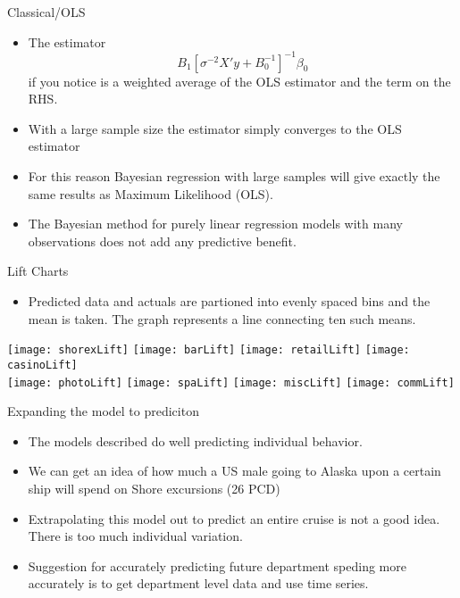 \documentclass{beamer}
\begin{document}
\begin{frame}{Classical/OLS}
	\begin{itemize}
		\item The estimator \[ B_1[\sigma^{-2} X'y + B_0^{-1} ]^{-1} \beta_0 \]
		 if you notice is a weighted average of the OLS estimator and the term on the RHS. 
		 \item With a large sample size the estimator simply converges to the OLS estimator
		 \item For this reason Bayesian regression with large samples will give exactly the same results as Maximum Likelihood (OLS). 
		 \item The Bayesian method for purely linear regression models with many observations does not add any predictive benefit. 
	\end{itemize}
\end{frame}
	
\begin{frame}{Lift Charts}
	\begin{itemize}
		\item Predicted data and actuals are partioned into evenly spaced bins and the mean is taken. The graph represents a line connecting ten such means.
	\end{itemize}
	\centering
	\texttt{[image: shorexLift]} \texttt{[image: barLift]} \texttt{[image: retailLift]} \texttt{[image: casinoLift]} \\
	\texttt{[image: photoLift]} \texttt{[image: spaLift]} \texttt{[image: miscLift]} \texttt{[image: commLift]} 
\end{frame}	

	
\begin{frame}{Expanding the model to prediciton}
	\begin{itemize}
		\item The models described do well predicting individual behavior. 
		\item We can get an idea of how much a US male going to Alaska upon a certain ship will spend on Shore excursions (26 PCD)
		\item Extrapolating this model out to predict an entire cruise is not a good idea. There is too much individual variation.
		\item Suggestion for accurately predicting future department speding more accurately is to get department level data and use time series. 
	\end{itemize}
\end{frame}	
	
\end{document}
